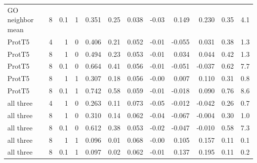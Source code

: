 \begin{table}[H]
\begin{tabular}{@{}lrrrrrrrrrrr@{}}
    GO neighbor mean & 8 & 0.1 & 1 & 0.351 & 0.25 & 0.038 & -0.03 & 0.149 & 0.230 & 0.35 & 4.1 \\
    ProtT5 & 4 & 1 & 0 & 0.406 & 0.21 & 0.052 & -0.01 & -0.055 & 0.031 & 0.38 & 1.3 \\
    ProtT5 & 8 & 1 & 0 & 0.494 & 0.23 & 0.053 & -0.01 & 0.034 & 0.044 & 0.42 & 1.3 \\
    ProtT5 & 8 & 0.1 & 0 & 0.664 & 0.41 & 0.056 & -0.01 & -0.051 & -0.037 & 0.62 & 7.7 \\
    ProtT5 & 8 & 1 & 1 & 0.307 & 0.18 & 0.056 & -0.00 & 0.007 & 0.110 & 0.31 & 0.8 \\
    ProtT5 & 8 & 0.1 & 1 & 0.742 & 0.58 & 0.059 & -0.01 & -0.018 & 0.090 & 0.76 & 8.6 \\
    all three & 4 & 1 & 0 & 0.263 & 0.11 & 0.073 & -0.05 & -0.012 & -0.042 & 0.26 & 0.7 \\
    all three & 8 & 1 & 0 & 0.310 & 0.14 & 0.062 & -0.04 & -0.067 & -0.004 & 0.30 & 1.0 \\
    all three & 8 & 0.1 & 0 & 0.612 & 0.38 & 0.053 & -0.02 & -0.047 & -0.010 & 0.58 & 7.3 \\
    all three & 8 & 1 & 1 & 0.096 & 0.01 & 0.068 & -0.00 & 0.105 & 0.157 & 0.11 & 0.1 \\
    all three & 8 & 0.1 & 1 & 0.097 & 0.02 & 0.062 & -0.01 & 0.137 & 0.195 & 0.11 & 0.2 \\
    \hline
  \end{tabular}
\end{table}
